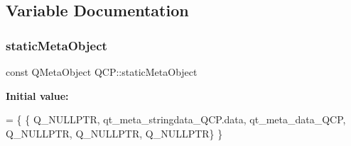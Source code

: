 \subsection{Variable Documentation}
\mbox{\label{namespace_q_c_p_a07ffa1eb1537a3b1f218ff2a442b2017}} 
\subsubsection{\texorpdfstring{static\+Meta\+Object}{staticMetaObject}}
{\footnotesize\ttfamily const Q\+Meta\+Object Q\+C\+P\+::static\+Meta\+Object}

{\bfseries Initial value\+:}
\begin{DoxyCode}
= \{
    \{ Q\_NULLPTR, qt\_meta\_stringdata\_QCP.data,
      qt\_meta\_data\_QCP,  Q\_NULLPTR, Q\_NULLPTR, Q\_NULLPTR\}
\}
\end{DoxyCode}
